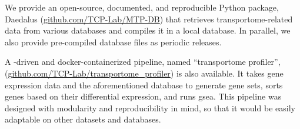 We provide an open-source, documented, and reproducible Python package, Daedalus (\href{https://github.com/TCP-Lab/MTP-DB}{github.com/TCP-Lab/MTP-DB}) that retrieves transportome-related data from various databases and compiles it in a local  database.
In parallel, we also provide pre-compiled database files as periodic releases.

A -driven and docker-containerized pipeline, named ``transportome profiler'',\\(\href{https://github.com/TCP-Lab/transportome_profiler}{github.com/TCP-Lab/transportome\_profiler}) is also available.
It takes gene expression data and the aforementioned database to generate gene sets, sorts genes based on their differential expression, and runs \gls{gsea}.
This pipeline was designed with modularity and reproducibility in mind, so that it would be easily adaptable on other datasets and databases.
